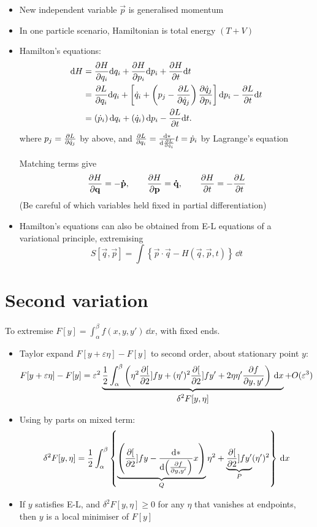 \begin{itemize}
    \item New independent variable $\vec{p}$ is generalised momentum
    \item In one particle scenario, Hamiltonian is total energy $(T+V)$
    \item Hamilton's equations:
          \begin{align*}
              \mathrm{d} H & = \frac{\partial{H}}{\partial{q_i}} \mathrm{d} q_i + \frac{\partial{H}}{\partial{p_i}} \mathrm{d} p_i +  \frac{\partial{H}}{\partial{t}} \mathrm{d} t                                                                       \\
                    & = \frac{\partial{L}}{\partial{q_i}}  \mathrm{d} q_i + \left[\dot{q}_i + \left(p_j - \frac{\partial{L}}{\partial{\dot{q}_j}}\right) \frac{\partial{\dot{q}_j}}{\partial{p_i}}\right] \mathrm{d} p_i - \frac{\partial{L}}{\partial{t}}\mathrm{d} t \\
                    & = \left(\dot{p}_i \right) \mathrm{d} q_i + \left( \dot{q}_i \right) \mathrm{d} p_i - \frac{\partial{L}}{\partial{t}}\mathrm{d} t.
          \end{align*}
          where $p_j = \frac{\partial{L}}{\partial{\dot{q}_j}}$ by above, and
          $\frac{\partial{L}}{\partial{q_i}} = \frac{\mathrm{d}{*}}{\mathrm{d}{\frac{\partial{L}}{\partial{\dot{q}_i}}}}{t} = \dot{p}_i$ by Lagrange's equation

          Matching terms give
          \[\frac{\partial{H}}{\partial{\boldsymbol{\mathbf{q}}}} = - \boldsymbol{\mathbf{\dot{p}}},  \qquad \frac{\partial{H}}{\partial{\boldsymbol{\mathbf{p}}}} = \boldsymbol{\mathbf{\dot{q}}}, \qquad \frac{\partial{H}}{\partial{t}} = - \frac{\partial{L}}{\partial{t}}\]
          (Be careful of which variables held fixed in partial differentiation)
    \item Hamilton's equations can also be obtained from E-L equations of a variational principle, extremising \[S[\vec{q}, \vec{p}] = \int \left\{\vec{p} \cdot \vec{q} - H(\vec{q}, \vec{p}, t)\right\} \, \dd t\]
\end{itemize}

\section{Second variation}
To extremise $F[y] = \int_\alpha^\beta f(x,y,y') \, \dd x$, with fixed ends.
\begin{itemize}
    \item Taylor expand $F[y+ \varepsilon \eta] - F[y]$ to second order, about stationary point $y$:
          \[F[y+ \varepsilon \eta] - F[y] = \varepsilon^2 \underbrace{ \frac{1}{2} \int_\alpha^\beta \left( \eta^2 \pdv[2]{f}{y} + (\eta')^2 \pdv[2]{f}{y'} + 2\eta \eta' \pdv{f}{ y, y'} \right)\, \dd x}_{\begin{displaystyle}\delta^2 F[y, \eta] \end{displaystyle} } + O(\varepsilon^3)\]
    \item Using by parts on mixed term:
          \[\delta^2 F[y , \eta ] =  \frac{1}{2} \int_\alpha^\beta \left\{ \underbrace{\left(  \frac{\partial{[}}{\partial{2}}]{f}{y} - \frac{\mathrm{d}{*}}{\mathrm{d}{\left( \frac{\partial{f}}{\partial{ y, y'}}\right)}}{x}  \right)}_{Q} \eta^2 + \underbrace{\frac{\partial{[}}{\partial{2}}]{f}{y'}}_{P} (\eta')^2 \right\} \, \mathrm{d} x\]
    \item If $y$ satisfies E-L, and $\delta^2 F[y , \eta ] \geq 0$ for any $\eta$ that vanishes at endpoints, then $y$ is a local minimiser of $F[y]$
\end{itemize}
